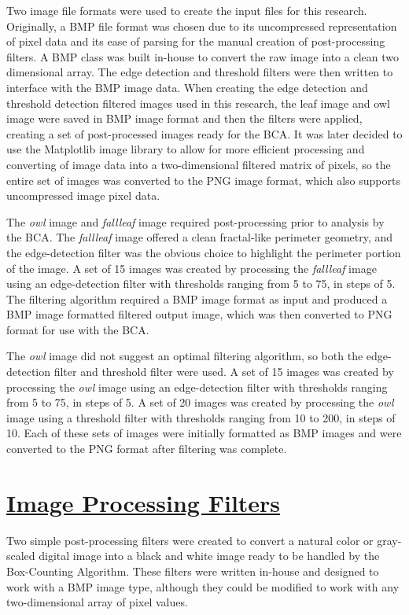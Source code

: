 \documentclass[12pt, oneside]{book}
\begin{document}
Two image file formats were used to create the input files for this research.  Originally, a BMP file format was chosen due to its uncompressed representation of pixel data and its ease of parsing for the manual creation of post-processing filters.  A BMP class was built in-house to convert the raw image into a clean two dimensional array.  The edge detection and threshold filters were then written to interface with the BMP image data.  When creating the edge detection and threshold detection filtered images used in this research, the leaf image and owl image were saved in BMP image format and then the filters were applied, creating a set of post-processed images ready for the BCA.  It was later decided to use the Matplotlib image library to allow for more efficient processing and converting of image data into a two-dimensional filtered matrix of pixels, so the entire set of images was converted to the PNG image format, which also supports uncompressed image pixel data.

The \textit{owl} image and \textit{fallleaf} image required post-processing prior to analysis by the BCA.  The \textit{fallleaf} image offered a clean fractal-like perimeter geometry, and the edge-detection filter was the obvious choice to highlight the perimeter portion of the image.  A set of 15 images was created by processing the \textit{fallleaf} image using an edge-detection filter with thresholds ranging from 5 to 75, in steps of 5.  The filtering algorithm required a BMP image format as input and produced a BMP image formatted filtered output image, which was then converted to PNG format for use with the BCA.  

The \textit{owl} image did not suggest an optimal filtering algorithm, so both the edge-detection filter and threshold filter were used.  A set of 15 images was created by processing the \textit{owl} image using an edge-detection filter with thresholds ranging from 5 to 75, in steps of 5.  A set of 20 images was created by processing the \textit{owl} image using a threshold filter with thresholds ranging from 10 to 200, in steps of 10.  Each of these sets of images were initially formatted as BMP images and were converted to the PNG format after filtering was complete.

% 
%
\section{\underline{Image Processing Filters}}
Two simple post-processing filters were created to convert a natural color or gray-scaled digital image into a black and white image ready to be handled by the Box-Counting Algorithm.  These filters were written in-house and designed to work with a BMP image type, although they could be modified to work with any two-dimensional array of pixel values.
\end{document}
